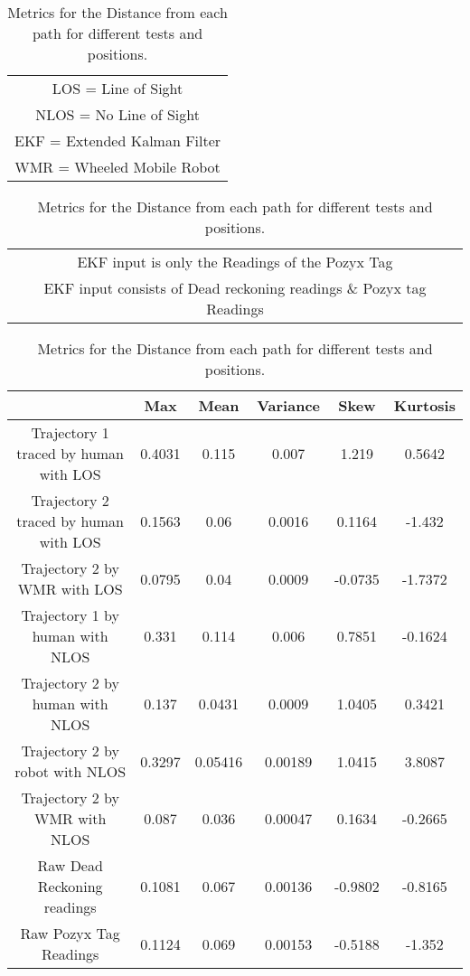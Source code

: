 \begin{table}[h!]
    \centering
    \begin{tabular}{|c|}
        \hline
        LOS = Line of Sight\\
        NLOS = No Line of Sight\\
        EKF = Extended Kalman Filter\\
        WMR = Wheeled Mobile Robot\\
    \end{tabular}
    \begin{tabular}{|c|}
        \hline
        \rowcolor{LightNavy} EKF input is only the Readings of the Pozyx Tag\\
        \rowcolor{LightGreen} EKF input consists of Dead reckoning readings \& Pozyx tag Readings\\
    \end{tabular}
    \begin{tabular}{|c|c|c|c|c|c|}
        \hline
        & Max & Mean & Variance & Skew & Kurtosis \\
        \hline
        \rowcolor{LightNavy}Trajectory 1 traced by human with LOS & 0.4031 & 0.115 & 0.007 & 1.219& 0.5642\\
        \hline
        \rowcolor{LightNavy}Trajectory 2 traced by human with LOS & 0.1563 & 0.06 & 0.0016 &0.1164 & -1.432\\
        \hline
        \rowcolor{LightNavy}Trajectory 2 by WMR with LOS & 0.0795 & 0.04 & 0.0009 & -0.0735 & -1.7372\\
        \hline
        \rowcolor{LightNavy}Trajectory 1 by human with NLOS & 0.331 & 0.114 & 0.006 & 0.7851 & -0.1624\\
        \hline
        \rowcolor{LightNavy}Trajectory 2 by human with NLOS & 0.137 & 0.0431& 0.0009 & 1.0405 & 0.3421\\
        \hline
        \rowcolor{LightNavy}Trajectory 2 by robot with NLOS &  0.3297 & 0.05416 & 0.00189 & 1.0415 & 3.8087\\
        \hline
        \rowcolor{LightGreen}Trajectory 2 by WMR with NLOS & 0.087 & 0.036 & 0.00047 & 0.1634 & -0.2665\\
        \hline
        Raw Dead Reckoning readings & 0.1081 & 0.067 & 0.00136 & -0.9802 & -0.8165\\
        \hline
        Raw Pozyx Tag Readings & 0.1124 & 0.069 & 0.00153 & -0.5188 & -1.352\\
        \hline
    \end{tabular}
    \caption{Metrics for the Distance from each path for different tests and positions.}
    \label{tb:results}
\end{table}
\newpage
